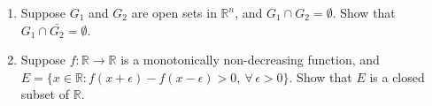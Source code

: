 \documentclass{article}
\begin{document}
\begin{enumerate}


\item Suppose $G_{1}$ and $G_{2}$ are open sets in $\mathbb{R}^{n}$, and $G_{1} \cap G_{2} = \emptyset$. Show that $G_{1} \cap \bar{G_{2}} = \emptyset$.




\item Suppose $f: \mathbb{R} \to \mathbb{R}$ is a monotonically non-decreasing function, and $E = \{x \in \mathbb{R}: f(x+ \epsilon) - f(x-\epsilon) > 0, \ \forall\, \epsilon>0\}$. Show that $E$ is a closed subset of $\mathbb{R}$.



\end{enumerate}
\end{document}

